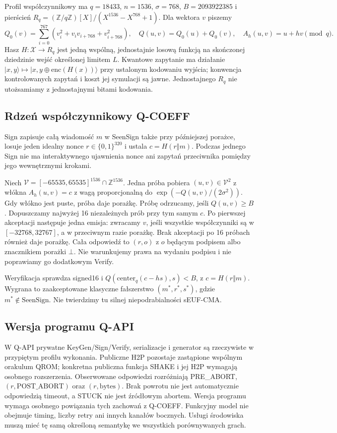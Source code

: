\documentclass[11pt,a4paper]{article}
\begin{document}
Profil współczynnikowy ma $q=18433$, $n=1536$, $\sigma=768$,
$B=2093922385$ i pierścień $R_q=(\mathbb Z/q\mathbb Z)[X]/(X^{1536}-X^{768}+1)$.
Dla wektora $v$ piszemy
\[
 Q_0(v)=\sum_{i=0}^{767}(v_i^2+v_iv_{i+768}+v_{i+768}^2),\quad
 Q(u,v)=Q_0(u)+Q_0(v),\quad A_h(u,v)=u+hv\pmod q.
\]
Hasz $H:\mathcal X\to R_q$ jest jedną wspólną, jednostajnie losową funkcją
na skończonej dziedzinie wejść określonej limitem $L$.
Kwantowe zapytanie ma działanie
$|x,y\rangle\mapsto|x,y\oplus\mathrm{enc}(H(x))\rangle$ przy ustalonym
kodowaniu wyjścia; konwencja kontrolowanych zapytań i koszt jej symulacji
są jawne. Jednostajnego $R_q$ nie utożsamiamy z jednostajnymi bitami kodowania.

\subsection*{Rdzeń współczynnikowy Q-COEFF}
Sign zapisuje całą wiadomość $m$ w SeenSign także przy późniejszej porażce,
losuje jeden idealny nonce $r\in\{0,1\}^{320}$ i ustala $c=H(r\Vert m)$.
Podczas jednego Sign nie ma interaktywnego ujawnienia nonce ani zapytań
przeciwnika pomiędzy jego wewnętrznymi krokami.

Niech $\mathcal V=[-65535,65535]^{1536}\cap\mathbb Z^{1536}$.
Jedna próba pobiera $(u,v)\in\mathcal V^2$ z włókna $A_h(u,v)=c$
z wagą proporcjonalną do $\exp(-Q(u,v)/(2\sigma^2))$.
Gdy włókno jest puste, próba daje porażkę. Próbę odrzucamy, jeśli
$Q(u,v)\ge B$. Dopuszczamy najwyżej 16 niezależnych prób przy tym samym $c$.
Po pierwszej akceptacji następuje jedna emisja: zwracamy $v$, jeśli
wszystkie współczynniki są w $[-32768,32767]$, a w przeciwnym razie porażkę.
Brak akceptacji po 16 próbach również daje porażkę. Cała odpowiedź to
$(r,o)$ z $o$ będącym podpisem albo znacznikiem porażki $\bot$.
Nie warunkujemy prawa na wydaniu podpisu i nie poprawiamy go dodatkowym Verify.

Weryfikacja sprawdza signed16 i $Q(\mathrm{center}_q(c-hs),s)<B$,
z $c=H(r\Vert m)$. Wygrana to zaakceptowane klasyczne fałszerstwo
$(m^*,r^*,s^*)$, gdzie $m^*\notin\mathrm{SeenSign}$.
Nie twierdzimy tu silnej niepodrabialności sEUF-CMA.

\subsection*{Wersja programu Q-API}
W Q-API prywatne KeyGen/Sign/Verify, serializacje i generator są rzeczywiste
w przypiętym profilu wykonania. Publiczne H2P pozostaje zastąpione
wspólnym orakulum QROM; konkretna publiczna funkcja SHAKE i jej H2P
wymagają osobnego rozszerzenia. Obserwowane odpowiedzi rozróżniają
PRE\_ABORT, $(r,\mathrm{POST\_ABORT})$ oraz $(r,\mathrm{bytes})$.
Brak powrotu nie jest automatycznie odpowiedzią timeout, a STUCK nie jest
źródłowym abortem. Wersja programu wymaga osobnego powiązania tych zachowań
z Q-COEFF. Funkcyjny model nie obejmuje timing, liczby retry ani innych
kanałów bocznych. Usługi środowiska muszą mieć tę samą określoną semantykę
we wszystkich porównywanych grach.
\end{document}
